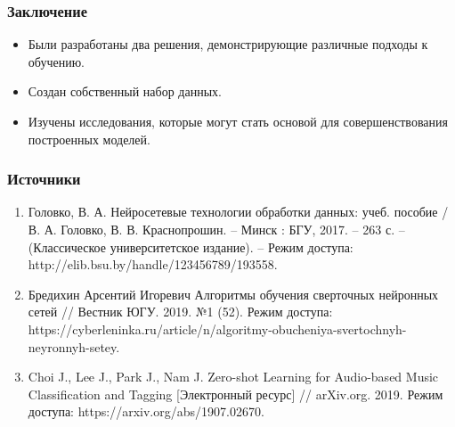 \documentclass{beamer}
\begin{document}
\begin{frame}
	\frametitle{Заключение}
	\begin{itemize}
		\item Были разработаны два решения, демонстрирующие различные подходы к обучению.
		\item Создан собственный набор данных.
		\item Изучены исследования, которые могут стать основой для совершенствования построенных моделей.
	\end{itemize}
\end{frame}

\begin{frame}
	\frametitle{Источники}
	\begin{enumerate}
		\item Головко, В. А. Нейросетевые технологии обработки данных: учеб. пособие / В. А. Головко, В. В. Краснопрошин. – Минск : БГУ, 2017. – 263 с. – (Классическое университетское издание). – Режим доступа: http://elib.bsu.by/handle/123456789/193558. 
		\item Бредихин Арсентий Игоревич Алгоритмы обучения сверточных нейронных сетей // Вестник ЮГУ. 2019. №1 (52). Режим доступа: https://cyberleninka.ru/article/n/algoritmy-obucheniya-svertochnyh-neyronnyh-setey. 
		\item Choi J., Lee J., Park J., Nam J. Zero-shot Learning for Audio-based Music Classification and Tagging [Электронный ресурс] // arXiv.org. 2019. Режим доступа: https://arxiv.org/abs/1907.02670.
	\end{enumerate}
\end{frame}
\end{document}
